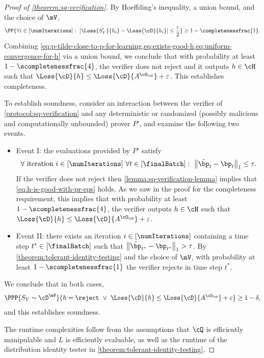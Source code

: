 \begin{proof}[Proof of \cref{theorem:sq-verification}]
	By Hoeffding's inequality, a union bound, and the choice of $\mV$, 
	\begin{equation}\label{eq:uniform-convergence-for-h}
		\PP{\forall i \in [\numIterations]: ~ \left|\Loss{S_V'}{h_i} - \Loss{\cD}{h_i}\right| \leq \frac{\varepsilon}{2}} \geq 1-\completenessfrac{1}.
	\end{equation}
	Combining \cref{eq:p-tilde-close-to-p-for-learning,eq:exists-good-h,eq:uniform-convergence-for-h} via a union bound, we conclude that with probability at least $1-\scompletenessfrac{4}$, the verifier does not reject and it outputs $h \in \cH$ such that $\Loss{\cD}{h} \leq \Loss{\cD}{A^{\cO_\cD}} + \varepsilon$. This establishes completeness.
	
	To establish soundness, consider an interaction between the verifier of \cref{protocol:sq-verification} and any deterministic or randomized (possibly malicious and computationally unbounded) prover $P'$, and examine the following two events.
	
	\begin{itemize}
		\item{
			Event I: the evaluations provided by $P'$ satisfy 
			\begin{equation}\label{eq:p-tilde-close-to-p-for-verification}
				\forall \text{ iteration } i \in [\numIterations] ~ \forall t \in [\finalBatch]: ~  \left\|\tilde{\bp}_t  - \bp_t\right\|_1 \leq \tau.
			\end{equation}
			If the verifier does not reject then \cref{lemma:sq-verification-lemma} implies that \cref{eq:h-is-good-with-pr-eps} holds. As we saw in the proof for the completeness requirement, this implies that with probability at least $1-\scompletenessfrac{4}$, the verifier outputs $h \in \cH$ such that $\Loss{\cD}{h} \leq \Loss{\cD}{A^{\cO_\cD}} + \varepsilon$.
		
		}
		\item{
			Event II: there exists an iteration $i \in [\numIterations]$ containing a time step $t^* \in [\finalBatch]$ such that $\left\|\tilde{\bp}_{t^*}  - \bp_{t^*}\right\|_1 > \tau$. By \cref{theorem:tolerant-identity-testing} and the choice of $\mV$, with probability at least $1-\scompletenessfrac{1}$ the verifier rejects in time step $t^*$.
		}
	\end{itemize}
	We conclude that in both cases, 
	\[
		\PPP{S_V \sim \cD^{\mV}}{h = \reject ~ \lor ~ \Loss{\cD}{h} \leq \Loss{\cD}{A^{\cO_\cD}} + \varepsilon} \geq 1-\delta,
	\]
	and this establishes soundness.

	The runtime complexities follow from the assumptions that $\cQ$ is efficiently manipulable and $L$ is efficiently evaluable, as well as the runtime of the distribution identity tester in \cref{theorem:tolerant-identity-testing}.
\end{proof}


